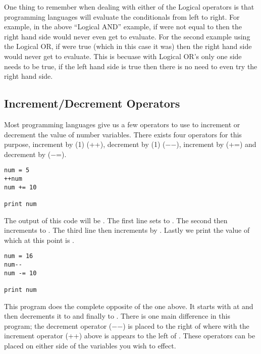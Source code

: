 One thing to remember when dealing with either of the Logical operators is that programming languages will evaluate the conditionals from left to right.
For example, in the above ``Logical AND'' example, if  were not equal to  then the right hand side  would never even get to evaluate.
For the second example using the Logical OR, if  were true (which in this case it was) then the right hand side would never get to evaluate.
This is becuase with Logical OR's only one side needs to be true, if the left hand side is true then there is no need to even try the right hand side.

\subsection{Increment/Decrement Operators}

Most programming languages give us a few operators to use to increment or decrement the value of number variables.
There exists four operators for this purpose, increment by \pigVal(1) (++), decrement by \pigVal(1) ($-$$ -$), increment by (+=) and decrement by ($-$=).

\begin{lstlisting}[caption={Increment Operators}]
num = 5
++num
num += 10

print num
\end{lstlisting}

The output of this code will be .
The first line sets  to .
The second then increments  to .
The third line then increments  by .
Lastly we print the value of  which at this point is .

\begin{lstlisting}[caption={Decrement Operators}]
num = 16
num--
num -= 10

print num
\end{lstlisting}

This program does the complete opposite of the one above.
It starts with  at  and then decrements it to  and finally to .
There is one main difference in this program; the decrement operator ($-$$-$) is placed to the right of  where with the increment operator (++) above
is appears to the left of .
These operators can be placed on either side of the variables you wish to effect.
\par

